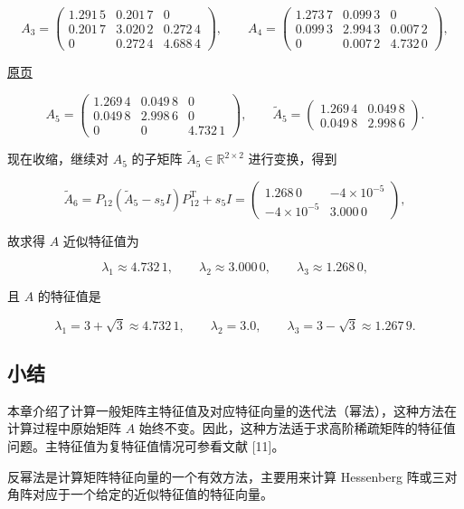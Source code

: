\documentclass[
  10pt,
  fontset=fandol]{ctexart}
\begin{document}
\[
A_3=\begin{pmatrix}
1.291\,5&0.201\,7&0\\
0.201\,7&3.020\,2&0.272\,4\\
0&0.272\,4&4.688\,4
\end{pmatrix},\qquad
A_4=\begin{pmatrix}
1.273\,7&0.099\,3&0\\
0.099\,3&2.994\,3&0.007\,2\\
0&0.007\,2&4.732\,0
\end{pmatrix},
\]

\href{../../source-images/pdf-259.jpeg}{原页}

\[
A_5=\begin{pmatrix}
1.269\,4&0.049\,8&0\\
0.049\,8&2.998\,6&0\\
0&0&\boxed{4.732\,1}
\end{pmatrix},\qquad
\widetilde A_5=\begin{pmatrix}1.269\,4&0.049\,8\\0.049\,8&2.998\,6\end{pmatrix}.
\]

现在收缩，继续对 \(A_5\) 的子矩阵 \(\widetilde A_5\in\mathbb R^{2\times2}\) 进行变换，得到

\[
\widetilde A_6=P_{12}(\widetilde A_5-s_5I)P_{12}^{\mathrm T}+s_5I
=\begin{pmatrix}\boxed{1.268\,0}&-4\times10^{-5}\\-4\times10^{-5}&\boxed{3.000\,0}\end{pmatrix},
\]

故求得 \(A\) 近似特征值为

\[
\lambda_1\approx4.732\,1,\qquad\lambda_2\approx3.000\,0,\qquad\lambda_3\approx1.268\,0,
\]

且 \(A\) 的特征值是

\[
\lambda_1=3+\sqrt3\approx4.732\,1,\qquad\lambda_2=3.0,\qquad\lambda_3=3-\sqrt3\approx1.267\,9.
\]

\subsection{小结}\label{ux5c0fux7ed3}

本章介绍了计算一般矩阵主特征值及对应特征向量的迭代法（幂法），这种方法在计算过程中原始矩阵 \(A\) 始终不变。因此，这种方法适于求高阶稀疏矩阵的特征值问题。主特征值为复特征值情况可参看文献 {[}11{]}。

反幂法是计算矩阵特征向量的一个有效方法，主要用来计算 Hessenberg 阵或三对角阵对应于一个给定的近似特征值的特征向量。
\end{document}
